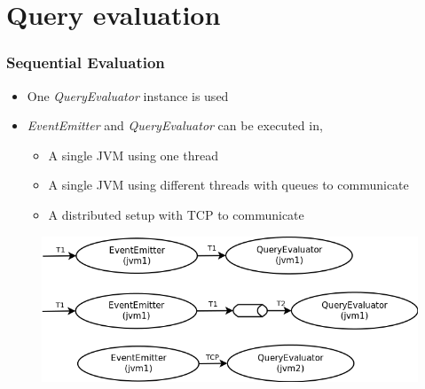 \documentclass[handout]{beamer}
\begin{document}
\section{Query evaluation}

\begin{frame}
\frametitle{Sequential Evaluation}

\begin{itemize}
        \item One \textit{QueryEvaluator} instance is used
        \item \textit{EventEmitter} and \textit{QueryEvaluator} can be executed in,
                \begin{itemize}
                        \item A single JVM using one thread
                        \item A single JVM using different threads with queues to communicate
                        \item A distributed setup with TCP to communicate 
                \end{itemize}
\end{itemize}

\begin{figure}
        \includegraphics[width=0.7\linewidth]{sequential.png}
\end{figure}

\end{frame}
\end{document}
